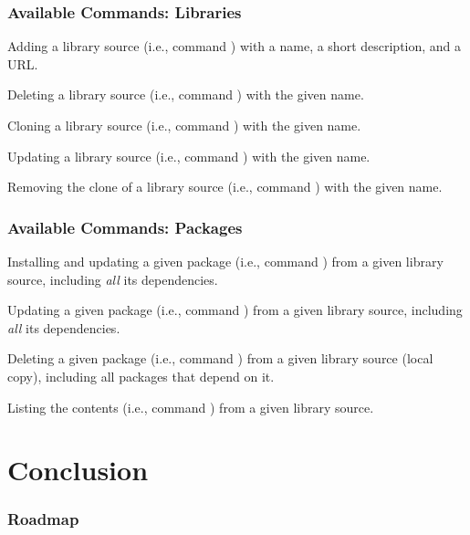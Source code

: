 \documentclass[mathserif,fleqn]{beamer}
\begin{document}
\begin{frame}
  \frametitle{Available Commands: Libraries}
  
   \begin{outeritemize}
   \item Adding a library source (i.e., command ) with a
    name, a short description, and a  URL.
   \item Deleting a library source (i.e., command ) with
    the given name.
   \item Cloning a library source (i.e., command ) with the
    given name.
   \item Updating a library source (i.e., command ) with
    the given name.
   \item Removing the clone of a library source (i.e., command
    ) with the given name.
   \end{outeritemize}
  
\end{frame}

\begin{frame}
  \frametitle{Available Commands: Packages}
  
   \begin{outeritemize}
   \item Installing and updating a given package (i.e., command
    ) from a given library source, including {\em all} its
    dependencies.
  \item Updating a given package (i.e., command ) from a given
    library source, including {\em all} its dependencies.
  \item Deleting a given package (i.e., command ) from a given
    library source (local copy), including all packages that depend on
    it.
  \item Listing the contents (i.e., command ) from a given
    library source.
   \end{outeritemize}
  
\end{frame}

\section{Conclusion}

\begin{frame}
  \frametitle{Roadmap} 
  \tableofcontents[currentsection]
\end{frame}
\end{document}
